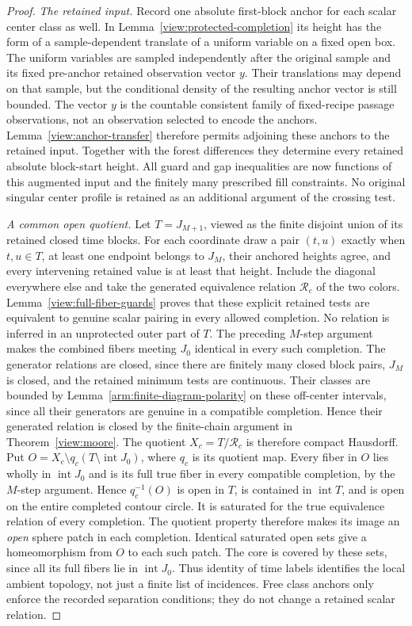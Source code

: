 \begin{proof}
\smallskip\noindent\emph{The retained input.}
Record one absolute first-block anchor for each scalar center class as well.
In Lemma~\ref{view:protected-completion} its height has the form of a
sample-dependent translate of a uniform variable on a fixed open box.
The uniform variables are sampled independently after the original
sample and its fixed pre-anchor retained observation vector $y$.
Their translations may depend on that sample, but the conditional
density of the resulting anchor vector is still bounded.  The vector
$y$ is the countable consistent family of fixed-recipe passage
observations, not an observation selected to encode the anchors.
Lemma~\ref{view:anchor-transfer}
therefore permits adjoining these anchors to the retained input.
Together with the forest differences they determine every retained
absolute block-start height.  All guard and gap inequalities are now
functions of this augmented input and the finitely many prescribed
fill constraints.  No original singular center profile is retained as
an additional argument of the crossing test.

\smallskip\noindent\emph{A common open quotient.}
Let $T=J_{M+1}$, viewed as the finite disjoint union of its
retained closed time blocks.  For each coordinate draw a pair $(t,u)$
exactly when $t,u\in T$, at least one endpoint belongs to $J_M$, their
anchored heights agree, and every intervening retained value is at
least that height.  Include the diagonal everywhere else and take the
generated equivalence relation $\mathcal R_c$ of the two colors.
Lemma~\ref{view:full-fiber-guards} proves that these explicit retained
tests are equivalent to genuine scalar pairing in every allowed
completion.  No relation is inferred in an unprotected outer part of
$T$.  The preceding $M$-step argument makes the combined fibers meeting
$J_0$ identical in every such completion.  The generator relations are
closed, since there are finitely many closed block pairs, $J_M$ is
closed, and the retained minimum tests are continuous.  Their classes are bounded
by Lemma~\ref{arm:finite-diagram-polarity} on these off-center intervals,
since all their generators are genuine in a compatible completion.  Hence
their generated relation is closed by the finite-chain argument in
Theorem~\ref{view:moore}.  The quotient $X_c=T/\mathcal R_c$
is therefore compact Hausdorff.  Put
$O=X_c\setminus q_c(T\setminus\operatorname{int}J_0)$, where $q_c$
is its quotient map.  Every fiber in $O$ lies wholly in
$\operatorname{int}J_0$ and is its full true fiber in every compatible
completion, by the $M$-step argument.  Hence $q_c^{-1}(O)$ is open in
$T$, is contained in $\operatorname{int}T$, and is open on the entire
completed contour circle.  It is saturated for the true equivalence
relation of every completion.  The quotient property therefore makes
its image an \emph{open} sphere patch in each completion.  Identical
saturated open sets give a homeomorphism from $O$ to each such patch.
The core is covered by these sets, since all its full fibers lie in
$\operatorname{int}J_0$.  Thus identity of time labels identifies the
local ambient topology, not just a finite list of incidences.
Free class anchors only enforce the recorded separation conditions;
they do not change a retained scalar relation.


\end{proof}
